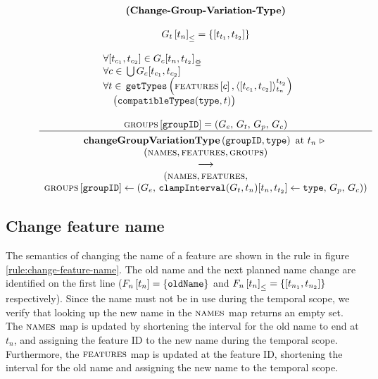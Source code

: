 \begin{figure}
    \renewcommand{\arraystretch}{1.1}
    \sossize$$\begin{array}{c}
      \ntyperule{Change-Group-Variation-Type}
      {\\
        \containing{G_t}{t_n} = \set{\interval{t_{t_1}}{t_{t_2}}} %
        \\
        \\
        \qqquad \qqquad \forall \interval{t_{c_1}}{t_{c_2}} \in \overlapping{G_c}{t_n}{t_{t_2}}\hfill\\ %
        \qqquad \qqquad\forall c \in \, \bigcup G_c \interval{t_{c_1}}{t_{c_2}}\hfill\\ %
        \qqquad \qqquad\forall t \in \, \var{getTypes}\left(\lookup{\features}{c}, \clamp{\interval{t_{c_1}}{t_{c_2}}}{t_n}{t_{t_2}}\right)\hfill \\ %
         \qqquad \qqquad \quad \big(\var{compatibleTypes}(\var{type}, t)\big)\hfill\\
         \\

        \lookup{\groups{}}{\var{groupID}} = \left( G_e,\, G_t,\, G_p,\, G_c \right)
      }
      {
        \textbf{changeGroupVariationType}\left( \var{groupID}, \var{type}\right) \text{ at } t_n \shove \\
        (\names{}, \features{}, \groups{}) \\
        \transition \\
        (\names{}, \features{}, \\
        \lookup{\groups{}}{\var{groupID}} \assign \left( G_e,\, \var{clampInterval}(G_t, t_n) \interval{t_n}{t_{t_2}} \assign \var{type},\, G_p,\, G_c \right))
      }
    \end{array}$$
  \caption{\label{rule:change-group-varation-type}}
\end{figure}

\subsection{Change feature name}
\label{sub:change-feature-name}

The semantics of changing the name of a feature are shown in the  rule in figure \vref{rule:change-feature-name}. The old name and the next planned name change are identified on the first line ($F_n \left[ t_n \right] = \left\{\texttt{oldName}\right\}$ and $\containing{F_n}{t_n} = \set{\interval{t_{n_1}}{t_{n_2}}}$ respectively). Since the name must not be in use during the temporal scope, we verify that looking up the new name in the $\textsc{names}{}$ map returns an empty set. The $\textsc{names}{}$ map is updated by shortening the interval for the old name to end at $t_n$, and assigning the feature ID to the new name during the temporal scope. Furthermore, the $\textsc{features}{}$ map is updated at the feature ID, shortening the interval for the old name and assigning the new name to the temporal scope. 

